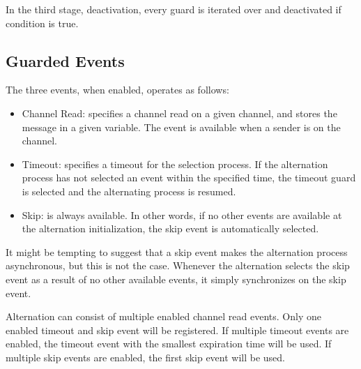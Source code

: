 In the third stage, deactivation, every guard is iterated over and deactivated if condition is true.

%

\subsection{Guarded Events}

The three events, when enabled, operates as follows:

\begin{itemize}[topsep=0em,itemsep=-1em,partopsep=0.5em,parsep=1em]
    \item Channel Read: specifies a channel read on a given channel, and stores the message in a given variable. The event is available when a sender is on the channel. 
    
    \item Timeout: specifies a timeout for the selection process. If the alternation process has not selected an event within the specified time, the timeout guard is selected and the alternating process is resumed. 
    
    \item Skip: is always available. In other words, if no other events are available at the alternation initialization, the skip event is automatically selected. 
\end{itemize}

It might be tempting to suggest that a skip event makes the alternation process asynch\-ronous, but this is not the case. Whenever the alternation selects the skip event as a result of no other available events, it simply synchronizes on the skip event. 

Alternation can consist of multiple enabled channel read events. Only one enabled timeout and skip event will be registered. If multiple timeout events are enabled, the timeout event with the smallest expiration time will be used. If multiple skip events are enabled, the first skip event will be used. 

